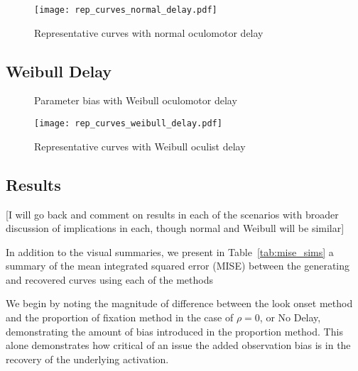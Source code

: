 \begin{figure}[H]
\centering
\texttt{[image: rep\_curves\_normal\_delay.pdf]}
\caption{Representative curves with normal oculomotor delay}
\label{fig:rep_curves_normal_delay}
\end{figure}

\subsection{Weibull Delay}


\begin{figure}[H]
\centering

\caption{Parameter bias with Weibull oculomotor delay}
\label{fig:par_bias_weibull_delay}
\end{figure}

\begin{figure}[H]
\centering
\texttt{[image: rep\_curves\_weibull\_delay.pdf]}
\caption{Representative curves with Weibull oculist delay}
\label{fig:rep_curves_weibull_delay}
\end{figure}





\subsection{Results}

[I will go back and comment on results in each of the scenarios with broader discussion of implications in each, though normal and Weibull will be similar]

In addition to the visual summaries, we present in Table~\ref{tab:mise_sims} a summary of the mean integrated squared error (MISE) between the generating and recovered curves using each of the methods

We begin by noting the  magnitude of difference between the look onset method and the proportion of fixation method in the case of $\rho = 0$, or No Delay, demonstrating the amount of bias introduced in the proportion method. This alone demonstrates how critical of an issue the added observation bias is in the recovery of the underlying activation.

